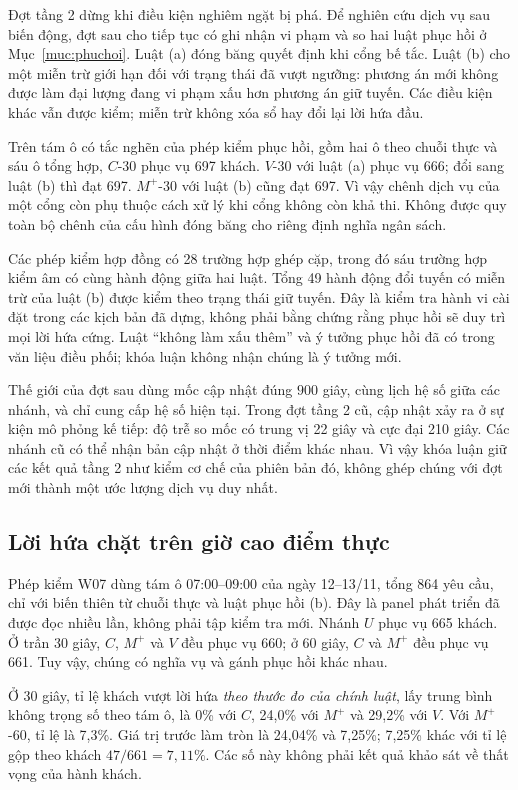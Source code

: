 Đợt tầng 2 dừng khi điều kiện nghiêm ngặt bị phá. Để nghiên cứu dịch vụ sau biến
động, đợt sau cho tiếp tục có ghi nhận vi phạm và so hai luật phục hồi ở
Mục~\ref{muc:phuchoi}. Luật (a) đóng băng quyết định khi cổng bế tắc. Luật (b)
cho một miễn trừ giới hạn đối với trạng thái đã vượt ngưỡng: phương án mới không
được làm đại lượng đang vi phạm xấu hơn phương án giữ tuyến. Các điều kiện khác
vẫn được kiểm; miễn trừ không xóa sổ hay đổi lại lời hứa đầu.

Trên tám ô có tắc nghẽn của phép kiểm phục hồi, gồm hai ô theo chuỗi thực và sáu
ô tổng hợp, $C$-30 phục vụ 697 khách. $V$-30 với luật (a) phục vụ 666; đổi sang
luật (b) thì đạt 697. $M^{+}$-30 với luật (b) cũng đạt 697. Vì vậy chênh dịch vụ
của một cổng còn phụ thuộc cách xử lý khi cổng không còn khả thi. Không được
quy toàn bộ chênh của cấu hình đóng băng cho riêng định nghĩa ngân sách.

Các phép kiểm hợp đồng có 28 trường hợp ghép cặp, trong đó sáu trường hợp kiểm
âm có cùng hành động giữa hai luật. Tổng 49 hành động đổi tuyến có miễn trừ của
luật (b) được kiểm theo trạng thái giữ tuyến. Đây là kiểm tra hành vi cài đặt
trong các kịch bản đã dựng, không phải bằng chứng rằng phục hồi sẽ duy trì mọi
lời hứa cứng. Luật ``không làm xấu thêm'' và ý tưởng phục hồi đã có trong văn
liệu điều phối; khóa luận không nhận chúng là ý tưởng mới.

Thế giới của đợt sau dùng mốc cập nhật đúng $900$ giây, cùng lịch hệ số giữa các
nhánh, và chỉ cung cấp hệ số hiện tại. Trong đợt tầng 2 cũ, cập nhật xảy ra ở
sự kiện mô phỏng kế tiếp: độ trễ so mốc có trung vị 22 giây và cực đại 210 giây.
Các nhánh cũ có thể nhận bản cập nhật ở thời điểm khác nhau. Vì vậy khóa luận
giữ các kết quả tầng 2 như kiểm cơ chế của phiên bản đó, không ghép chúng với
đợt mới thành một ước lượng dịch vụ duy nhất.

\subsection{Lời hứa chặt trên giờ cao điểm thực}


Phép kiểm W07 dùng tám ô 07:00--09:00 của ngày 12--13/11, tổng 864 yêu cầu,
chỉ với biến thiên từ chuỗi thực và luật phục hồi (b). Đây là panel phát triển
đã được đọc nhiều lần, không phải tập kiểm tra mới. Nhánh $U$ phục vụ 665 khách.
Ở trần 30 giây, $C$, $M^{+}$ và $V$ đều phục vụ 660; ở 60 giây, $C$ và
$M^{+}$ đều phục vụ 661. Tuy vậy, chúng có nghĩa vụ và gánh phục hồi khác nhau.

Ở 30 giây, tỉ lệ khách vượt lời hứa \emph{theo thước đo của chính luật}, lấy
trung bình không trọng số theo tám ô, là 0\% với $C$, 24,0\% với $M^{+}$ và
29,2\% với $V$. Với $M^{+}$-60, tỉ lệ là 7,3\%. Giá trị trước làm tròn là
24,04\% và 7,25\%; 7,25\% khác với tỉ lệ gộp theo khách $47/661=7{,}11\%$.
Các số này không phải kết quả khảo sát về thất vọng của hành khách.

